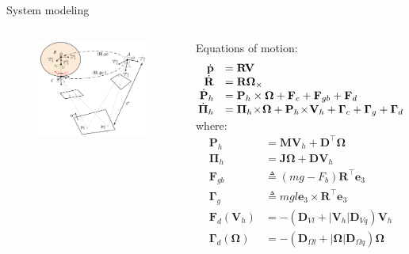 \documentclass{beamer}
\begin{document}
\begin{frame}{System modeling}
	\begin{columns}
		\begin{figure}
			\includegraphics[width = 50mm]{Images/Notation.png}
		\end{figure}
		\begin{block}{Equations of motion:}
			\scriptsize
			\begin{equation*}\label{eq:system2}
			\begin{array}{rl}
			\dot{\mathbf{p}} & =  \mathbf{R} \mathbf{V} \\
			\dot{\mathbf{R}} & =  \mathbf{R} \mathbf{\Omega}_\times \\
			\!\!\dot{\mathbf{P}}_h &= \mathbf{P}_h \times \mathbf{\Omega} +\mathbf{F}_c + \mathbf{F}_{gb} + \mathbf{F}_d  \\
			\!\!\dot{\mathbf{\Pi}}_h &=  \mathbf{\Pi}_h \!\times\! \mathbf{\mathbf{\Omega}} + \mathbf{P}_h \!\times \!\mathbf{V}_h  +\mathbf{\Gamma}_c + \mathbf{\Gamma}_g + \mathbf{\Gamma}_d \!\!\vspace{-0.2cm}
			\end{array}
			\end{equation*} \vspace{-0.3cm}
			where: \\
			\begin{equation*}
			\begin{array}{rl}
			\mathbf{P}_h & = \mathbf{M}\mathbf{V}_h + \mathbf{D}^{\!\top} \mathbf{\Omega}\\[1ex]
			\mathbf{\Pi}_h & = \mathbf{J} \mathbf{\Omega} + \mathbf{D}\mathbf{V}_h \\
			\mathbf{F}_{gb}  &\triangleq (m g - F_b) \mathbf{R}^{\!\top} \mathbf{e}_3\\
			\mathbf{\Gamma}_g  &\triangleq mgl\mathbf{e}_{3}\! \times \!\mathbf{R}^{\!\top} \mathbf{e}_3\\
			\mathbf{F}_d(\mathbf{V}_h) & = - (\mathbf{D}_{V\!l}   +|\mathbf{V}_h|\mathbf{D}_{V\!q} )\mathbf{V}_h  \\
			\mathbf{\Gamma}_d(\mathbf{\Omega})& =  - (\mathbf{D}_{\Omega l}  + |\mathbf{\Omega}|\mathbf{D}_{\Omega q} )\mathbf{\Omega}
			\end{array}
			\end{equation*}
		\end{block}
	\end{columns}

\end{frame}
\end{document}
